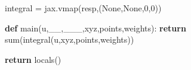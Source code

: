\documentclass[
  11pt,
]{article}
\newenvironment{Shaded}{}{}
\newcommand{\BuiltInTok}[1]{#1}
\newcommand{\ControlFlowTok}[1]{\textcolor[rgb]{0.00,0.44,0.13}{\textbf{#1}}}
\newcommand{\DecValTok}[1]{\textcolor[rgb]{0.25,0.63,0.44}{#1}}
\newcommand{\KeywordTok}[1]{\textcolor[rgb]{0.00,0.44,0.13}{\textbf{#1}}}
\newcommand{\NormalTok}[1]{#1}
\newcommand{\OperatorTok}[1]{\textcolor[rgb]{0.40,0.40,0.40}{#1}}
\newcommand{\VariableTok}[1]{\textcolor[rgb]{0.10,0.09,0.49}{#1}}
\begin{document}
\begin{Shaded}
\begin{Highlighting}[]
\NormalTok{    integral }\OperatorTok{=}\NormalTok{ jax.vmap(resp,(}\VariableTok{None}\NormalTok{,}\VariableTok{None}\NormalTok{,}\DecValTok{0}\NormalTok{,}\DecValTok{0}\NormalTok{))}

    \KeywordTok{def}\NormalTok{ main(u,\_\_,\_\_\_,xyz,points,weights):}
        \ControlFlowTok{return} \BuiltInTok{sum}\NormalTok{(integral(u,xyz,points,weights))}
    
    \ControlFlowTok{return} \BuiltInTok{locals}\NormalTok{()}

\end{Highlighting}
\end{Shaded}
\end{document}
